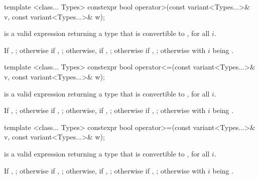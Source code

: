%
\begin{itemdecl}
template <class... Types>
  constexpr bool operator>(const variant<Types...>& v, const variant<Types...>& w);
\end{itemdecl}

\begin{itemdescr}
\pnum
\requires
{} is a valid expression returning a type that is
convertible to , for all $i$.

\pnum
\returns
If , ;
otherwise if , ;
otherwise, if , ;
otherwise if , ;
otherwise  with $i$ being .
\end{itemdescr}

%
\begin{itemdecl}
template <class... Types>
  constexpr bool operator<=(const variant<Types...>& v, const variant<Types...>& w);
\end{itemdecl}

\begin{itemdescr}
\pnum
\requires
{} is a valid expression returning a type that is
convertible to , for all $i$.

\pnum
\returns
If , ;
otherwise if , ;
otherwise, if , ;
otherwise if , ;
otherwise  with $i$ being .
\end{itemdescr}

%
\begin{itemdecl}
template <class... Types>
  constexpr bool operator>=(const variant<Types...>& v, const variant<Types...>& w);
\end{itemdecl}

\begin{itemdescr}
\pnum
\requires
{} is a valid expression returning a type that is
convertible to , for all $i$.

\pnum
\returns
If , ;
otherwise if , ;
otherwise, if , ;
otherwise if , ;
otherwise  with $i$ being .
\end{itemdescr}

